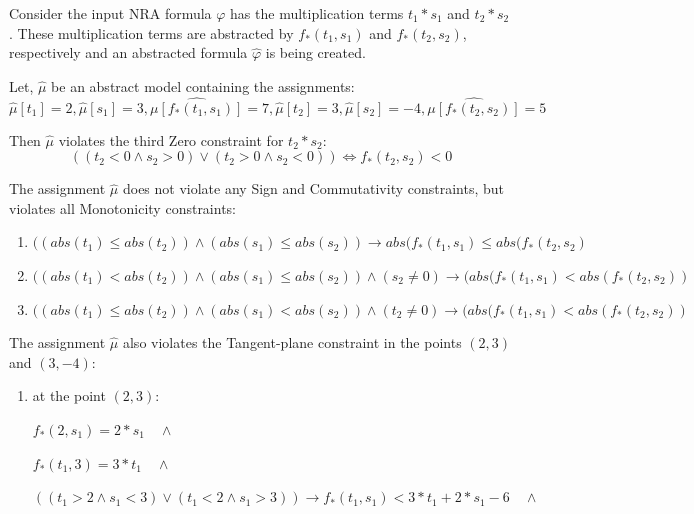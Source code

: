 \begin{example}
    Consider the input NRA formula $\varphi$ has the multiplication terms $t_{1} \ast s_{1}$ and $t_{2} \ast s_{2}$. These multiplication terms are abstracted by $f_{\ast}(t_{1}, s_{1})$ and $f_{\ast}(t_{2}, s_{2})$, respectively and an abstracted formula $\hat{\varphi}$ is being created.\newline
    
    Let, $\hat{\mu}$ be an abstract model containing the assignments:
    $$\hat{\mu}[t_{1}] = 2, \hat{\mu}[s_{1}] = 3, \hat{\mu[f_{\ast}(t_{1}, s_{1})]} = 7, \hat{\mu}[t_{2}] = 3, \hat{\mu}[s_{2}] = -4, \hat{\mu[f_{\ast}(t_{2}, s_{2})]} = 5$$
    
    Then $\hat{\mu}$ violates the third Zero constraint for $t_{2} \ast s_{2}$:
    $$((t_{2} < 0 \wedge s_{2} > 0) \vee (t_{2} > 0 \wedge s_{2} < 0)) \Leftrightarrow f_{\ast}(t_{2}, s_{2}) < 0$$
    
    The assignment $\hat{\mu}$ does not violate any Sign and Commutativity constraints, but violates all Monotonicity constraints:
    \begin{enumerate}
    \item $((abs(t_{1}) \leq abs(t_{2})) \wedge (abs(s_{1}) \leq abs(s_{2})) \to abs(f_{\ast}(t_{1}, s_{1}) \leq abs(f_{\ast}(t_{2}, s_{2})$
    \item $((abs(t_{1}) < abs(t_{2})) \wedge (abs(s_{1}) \leq abs(s_{2})) \wedge (s_{2} \neq 0) \to (abs(f_{\ast}(t_{1}, s_{1}) < abs(f_{\ast}(t_{2}, s_{2}))$
    \item $((abs(t_{1}) \leq abs(t_{2})) \wedge (abs(s_{1}) < abs(s_{2})) \wedge (t_{2} \neq 0) \to (abs(f_{\ast}(t_{1}, s_{1}) < abs(f_{\ast}(t_{2}, s_{2}))$
    \end{enumerate}
    
    The assignment $\hat{\mu}$ also violates the Tangent-plane constraint in the points $(2, 3)$ and $(3, -4)$: 
    \begin{enumerate}
    \item at the point $(2, 3)$: 
    
    $f_{\ast}(2, s_{1}) = 2 \ast s_{1} \quad \wedge$
    
    $f_{\ast}(t_{1}, 3) = 3 \ast t_{1} \quad \wedge$
    
    $((t_{1} > 2 \wedge s_{1} < 3) \vee (t_{1} < 2 \wedge s_{1} > 3)) \to f_{\ast}(t_{1}, s_{1}) < 3 \ast t_{1} + 2 \ast s_{1} - 6 \quad \wedge$
    

\end{enumerate}
\end{example}
